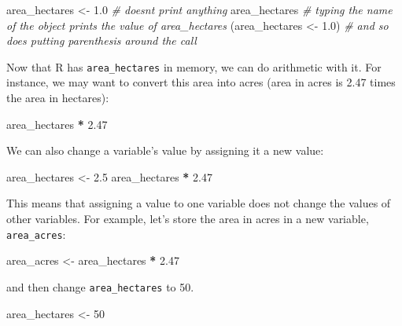 \documentclass[
]{book}
\newenvironment{Shaded}{\begin{snugshade}}{\end{snugshade}}
\newcommand{\CommentTok}[1]{\textcolor[rgb]{0.56,0.35,0.01}{\textit{#1}}}
\newcommand{\DecValTok}[1]{\textcolor[rgb]{0.00,0.00,0.81}{#1}}
\newcommand{\FloatTok}[1]{\textcolor[rgb]{0.00,0.00,0.81}{#1}}
\newcommand{\NormalTok}[1]{#1}
\newcommand{\OtherTok}[1]{\textcolor[rgb]{0.56,0.35,0.01}{#1}}
\newcommand{\SpecialCharTok}[1]{\textcolor[rgb]{0.81,0.36,0.00}{\textbf{#1}}}
\begin{document}
\begin{Shaded}
\begin{Highlighting}[]
\NormalTok{area\_hectares }\OtherTok{\textless{}{-}} \FloatTok{1.0}    \CommentTok{\# doesn\textquotesingle{}t print anything}
\NormalTok{area\_hectares           }\CommentTok{\# typing the name of the object prints the value of \textasciigrave{}area\_hectares\textasciigrave{}}
\NormalTok{(area\_hectares }\OtherTok{\textless{}{-}} \FloatTok{1.0}\NormalTok{)  }\CommentTok{\# and so does putting parenthesis around the call }
\end{Highlighting}
\end{Shaded}

Now that R has \texttt{area\_hectares} in memory, we can do arithmetic with it. For
instance, we may want to convert this area into acres (area in acres is 2.47 times the area in hectares):

\begin{Shaded}
\begin{Highlighting}[]
\NormalTok{area\_hectares  }\SpecialCharTok{*} \FloatTok{2.47}
\end{Highlighting}
\end{Shaded}

We can also change a variable's value by assigning it a new value:

\begin{Shaded}
\begin{Highlighting}[]
\NormalTok{area\_hectares }\OtherTok{\textless{}{-}} \FloatTok{2.5}
\NormalTok{area\_hectares }\SpecialCharTok{*} \FloatTok{2.47}
\end{Highlighting}
\end{Shaded}

This means that assigning a value to one variable does not change the values of
other variables. For example, let's store the area in acres in a new
variable, \texttt{area\_acres}:

\begin{Shaded}
\begin{Highlighting}[]
\NormalTok{area\_acres }\OtherTok{\textless{}{-}}\NormalTok{ area\_hectares }\SpecialCharTok{*} \FloatTok{2.47}
\end{Highlighting}
\end{Shaded}

and then change \texttt{area\_hectares} to 50.

\begin{Shaded}
\begin{Highlighting}[]
\NormalTok{area\_hectares }\OtherTok{\textless{}{-}} \DecValTok{50}
\end{Highlighting}
\end{Shaded}
\end{document}
